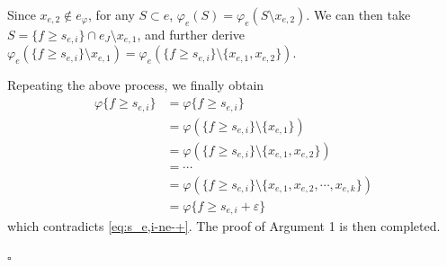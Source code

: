 \documentclass[12pt,a4paper]{article}
\newenvironment{proof}{\medskip\noindent{\bf Proof. }}{\hfill$\square$\medskip}
\begin{document}
\begin{proof}
Since $x_{e,2}\not\in e_\varphi$, for any $S\subset e$, $\varphi_e(S)=\varphi_e(S\setminus x_{e,2})$. We can then take $S=\{f\ge s_{e,i}\}\cap e_J\setminus x_{e,1}$, and further derive $\varphi_e(\{f\ge s_{e,i}\} \setminus x_{e,1})=\varphi_e(\{f\ge s_{e,i}\} \setminus \{x_{e,1},x_{e,2}\})$.

Repeating the above process, we finally obtain 
\begin{align*}
\varphi\{f\ge s_{e,i}\}&=\varphi\{f\ge s_{e,i}\}
\\&=\varphi(\{f\ge s_{e,i}\} \setminus \{x_{e,1}\})
\\&=\varphi(\{f\ge s_{e,i}\} \setminus \{x_{e,1},x_{e,2}\})
\\&=\cdots
\\&=    \varphi(\{f\ge s_{e,i}\} \setminus \{x_{e,1},x_{e,2},\cdots,x_{e,k}\})
\\&=\varphi\{f\ge s_{e,i}+\varepsilon\}
\end{align*}
which contradicts \eqref{eq:s_e,i-ne-+}. The proof of Argument 1 is then completed.

\vspace{0.2cm}


\end{proof}
\end{document}
